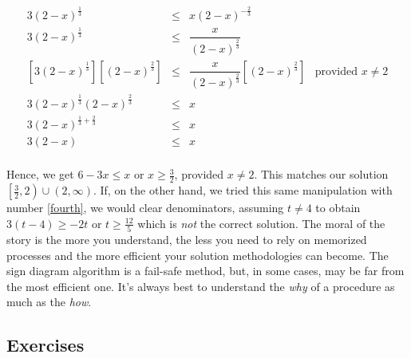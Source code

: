 \[ \begin{array}{rclr}

3 (2-x)^{\frac{1}{3}} & \leq & x (2-x)^{-\frac{2}{3}} & \\

3 (2-x)^{\frac{1}{3}} & \leq & \dfrac{x}{(2-x)^{\frac{2}{3}}} & \\

\left[3 (2-x)^{\frac{1}{3}} \right] \left[  (2-x)^{\frac{2}{3}}\right]& \leq & \dfrac{x}{(2-x)^{\frac{2}{3}}}  \left[  (2-x)^{\frac{2}{3}}\right]&  \text{provided $x \neq 2$} \\
3 (2-x)^{\frac{1}{3}} (2-x)^{\frac{2}{3}} & \leq & x&  \\

3 (2-x)^{\frac{1}{3}+\frac{2}{3}} & \leq & x& \\

3(2-x) & \leq & x  & \\ \end{array} \]

Hence, we get $6-3x \leq x$ or $x \geq \frac{3}{2}$, provided $x \neq 2$. This matches our solution $\left[\frac{3}{2},2\right) \cup (2, \infty)$.  If, on the other hand, we tried this same manipulation with number \ref{fourth}, we would clear denominators, assuming $t \neq 4$ to obtain $3(t-4) \geq -2t$ or $t \geq \frac{12}{5}$ which is \textit{not} the correct solution.  The moral of the story is the more you understand, the less you need to rely on memorized processes and the more efficient your solution methodologies can become.  The sign diagram algorithm is a fail-safe method, but, in some cases, may be far from the most efficient one.  It's always best to understand the \textit{why} of a procedure as much as the \textit{how}.  

\newpage

\subsection{Exercises}



\closegraphsfile